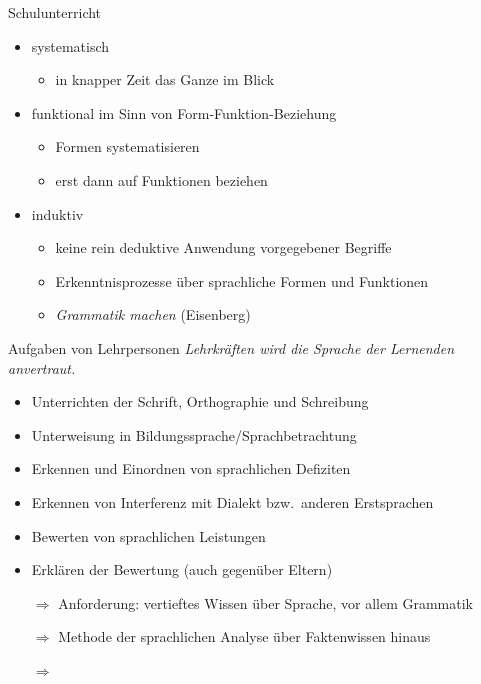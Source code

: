 \begin{frame}
  {Schulunterricht}
  \begin{itemize}[<+->]
    \item \alert{systematisch}
      \begin{itemize}
        \item in knapper Zeit das Ganze im Blick
      \end{itemize}
      \vspace{\baselineskip}
    \item funktional im Sinn von \alert{Form-Funktion-Beziehung}
      \begin{itemize}
        \item Formen systematisieren
        \item erst dann auf Funktionen beziehen
      \end{itemize}
      \vspace{\baselineskip}
    \item \alert{induktiv}
      \begin{itemize}
        \item keine rein deduktive Anwendung vorgegebener Begriffe
        \item Erkenntnisprozesse über sprachliche Formen und Funktionen
        \item \alert{\textit{Grammatik machen}} (Eisenberg)
      \end{itemize}
  \end{itemize}
\end{frame}

\begin{frame}
  {Aufgaben von Lehrpersonen}
  \pause
  \alert{\textit{Lehrkräften wird die Sprache der Lernenden anvertraut.}} \citep{Eisenberg2004}\\[\baselineskip]
  \pause
  \begin{itemize}[<+->]
    \item Unterrichten der Schrift, Orthographie und Schreibung
    \item Unterweisung in Bildungssprache\slash Sprachbetrachtung
    \item Erkennen und \alert{Einordnen} von \alert{sprachlichen Defiziten}
    \item Erkennen von \alert{Interferenz mit Dialekt bzw.\ anderen Erstsprachen}
    \item \alert{Bewerten} von sprachlichen Leistungen
    \item \alert{Erklären} der Bewertung (auch gegenüber Eltern)
      \vspace{\baselineskip}
    \item[$\Rightarrow$] Anforderung: vertieftes Wissen über Sprache, vor allem Grammatik
    \item[$\Rightarrow$] Methode der sprachlichen Analyse über Faktenwissen hinaus
    \item[$\Rightarrow$] 
  \end{itemize}
\end{frame}


